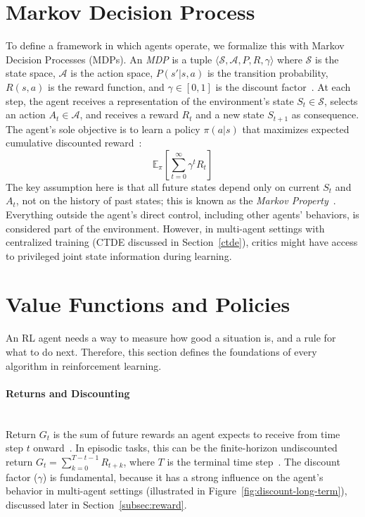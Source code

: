 \section{Markov Decision Process}
To define a framework in which agents operate, we formalize this with Markov Decision Processes (MDPs). An \emph{MDP} is a tuple \(\langle \mathcal{S}, \mathcal{A}, P, R, \gamma \rangle\) where \(\mathcal{S}\) is the state space, \(\mathcal{A}\) is the action space, \(P(s'|s,a)\) is the transition probability, \(R(s,a)\) is the reward function, and \(\gamma \in [0,1]\) is the discount factor~\cite{sutton}. At each step, the agent receives a representation of the environment's state \(S_t \in \mathcal{S}\), selects an action \(A_t \in \mathcal{A}\), and receives a reward \(R_t\) and a new state \(S_{t+1}\) as consequence. The agent's sole objective is to learn a policy \(\pi(a|s)\) that maximizes expected cumulative discounted reward~\cite{sutton}:
\[
  \mathbb{E}_\pi\left[\sum_{t=0}^{\infty} \gamma^t R_t\right]
\]
The key assumption here is that all future states depend only on current \(S_t\) and \(A_t\), not on the history of past states; this is known as the \emph{Markov Property}~\cite{sutton}. Everything outside the agent's direct control, including other agents' behaviors, is considered part of the environment. However, in multi-agent settings with centralized training (CTDE discussed in Section~\ref{ctde}), critics might have access to privileged joint state information during learning.

\section{Value Functions and Policies}
An RL agent needs a way to measure how good a situation is, and a rule for what to do next. Therefore, this section defines the foundations of every algorithm in reinforcement learning.

\paragraph{Returns and Discounting}\mbox{}\\
Return $G_t$ is the sum of future rewards an agent expects to receive from time step $t$ onward~\cite{spinningup2018}. In episodic tasks, this can be the finite-horizon undiscounted return $G_t = \sum_{k=0}^{T-t-1} R_{t+k}$, where $T$ is the terminal time step~\cite{spinningup2018}. The discount factor ($\gamma$) is fundamental, because it has a strong influence on the agent's behavior in multi-agent settings (illustrated in Figure~\ref{fig:discount-long-term}), discussed later in Section~\ref{subsec:reward}.

